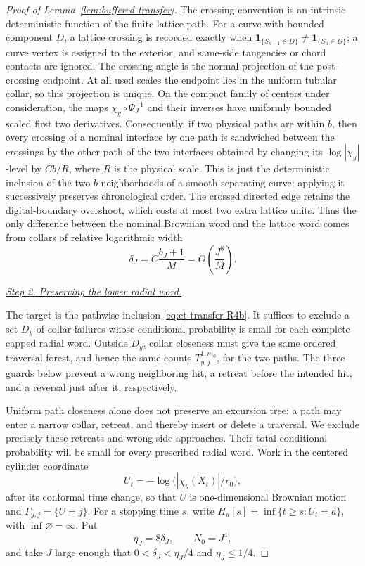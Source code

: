 \begin{proof}[Proof of Lemma~\ref{lem:buffered-transfer}]
The crossing convention is an intrinsic deterministic function of the
finite lattice path.  For a curve with bounded component $D$, a lattice
crossing is recorded exactly when
$\mathbf1_{\{S_{n-1}\in D\}}\ne\mathbf1_{\{S_n\in D\}}$; a curve vertex
is assigned to the exterior, and same-side tangencies or chord contacts are
ignored.  The crossing angle is the normal projection of the post-crossing
endpoint.  At all used scales the endpoint lies in the uniform tubular
collar, so this projection is unique.  On the compact family of
centers under consideration, the maps $\chi_y\circ\Psi_J^{-1}$ and
their inverses have uniformly bounded scaled first two derivatives.
Consequently, if two physical paths are within $b$, then every
crossing of a nominal interface by one path is sandwiched between the
crossings by the other path of the two interfaces obtained by changing
its $\log|\chi_y|$-level by $Cb/R$, where $R$ is the physical
scale.  This is just the deterministic inclusion of the two
$b$-neighborhoods of a smooth separating curve; applying it
successively preserves chronological order.
The crossed directed edge retains the digital-boundary overshoot, which
costs at most two extra lattice units.  Thus
the only difference between the nominal Brownian word and the lattice
word comes from collars of relative logarithmic width
\begin{equation}
\delta_J=C\frac{b_J+1}{M}=O\left(\frac{J^8}{M}\right).\label{eq:ct-transfer-33}
\end{equation}

\smallskip\noindent
\underline{\textit{Step 2. Preserving the lower radial word.}}

The target is the pathwise inclusion \eqref{eq:ct-transfer-R4b}.
It suffices to exclude a set $D_y$ of collar failures whose conditional
probability is small for each complete capped radial word. Outside $D_y$,
collar closeness must give the same ordered traversal forest, and hence the
same counts $T_{y,j}^{1,m_0}$, for the two paths. The three guards below
prevent a wrong neighboring hit, a retreat before the intended hit, and a
reversal just after it, respectively.

Uniform path closeness alone does not preserve an excursion tree: a path
may enter a narrow collar, retreat, and thereby insert or delete a traversal.
We exclude precisely these retreats and wrong-side approaches.  Their total
conditional probability will be small for every prescribed radial word.  Work in the centered cylinder coordinate
\[
U_t=-\log\bigl(|\chi_y(X_t)|/r_0\bigr),
\]
after its conformal time change, so that $U$ is one-dimensional Brownian
motion and $\Gamma_{y,j}=\{U=j\}$.  For a stopping time $s$, write
$H_a[s]=\inf\{t\ge s:U_t=a\}$, with $\inf\varnothing=\infty$.  Put
\begin{equation}
\eta_J=8\delta_J,\qquad N_0=J^4,\label{eq:ct-transfer-R1}
\end{equation}
and take $J$ large enough that $0<\delta_J<\eta_J/4$ and
$\eta_J\le1/4$.


\end{proof}
